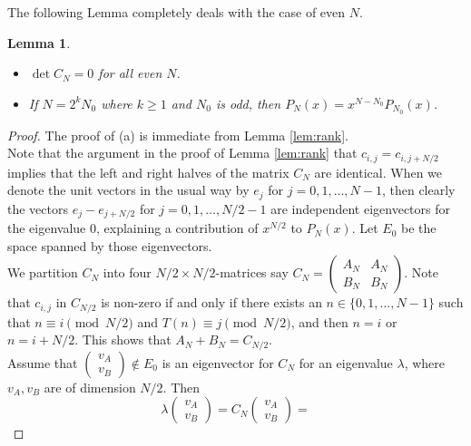 \documentclass[10pt]{article}
\newtheorem{lemma}{Lemma}
\theoremstyle{definition}
\begin{document}
The following Lemma completely deals with the case of even $ N $.

\begin{lemma} \label{lem:even}\
    \begin{itemize}
        \item[\emph{\textbf{(a)}}]
        $ \det C_N = 0 $ for all even $ N $.
        \item[\emph{\textbf{(b)}}]
        If $ N = 2^k N_0 $ where $ k \geq 1 $ and $ N_0 $ is odd, then $ P_N(x) = x^{N-N_0} P_{N_0}(x) $.
    \end{itemize}
\end{lemma}

\begin{proof}
    The proof of (a) is immediate from Lemma \ref{lem:rank}. \\
    Note that the argument in the proof of Lemma \ref{lem:rank} that $ c_{i,j} = c_{i,j+N/2} $ implies that
    the left and right halves of the matrix $ C_N $ are identical. When we denote the unit vectors in the
    usual way by $ e_j $ for $ j = 0, 1, \ldots, N-1 $, then clearly the vectors $ e_j - e_{j+N/2} $ for
    $ j = 0, 1, \ldots, N/2-1 $ are independent eigenvectors for the eigenvalue $ 0 $, explaining a
    contribution of $ x^{N/2} $ to $ P_N(x) $. Let $ E_0 $ be the space spanned by those eigenvectors. \\
    We partition $ C_N $ into four $ N/2 \times N/2 $-matrices say
    $ C_N = \begin{pmatrix} A_N & A_N \\ B_N & B_N \end{pmatrix} $. Note that $ c_{i,j} $ in $ C_{N/2} $ is
    non-zero if and only if there exists an $ n \in \{ 0, 1, \ldots, N-1 \} $ such that
    $ n \equiv i \pmod{N/2} $ and $ T(n) \equiv j \pmod{N/2} $, and then $ n = i $ or $ n = i + N/2 $. This
    shows that $ A_N + B_N = C_{N/2} $. \\
    Assume that $ \begin{pmatrix} v_A \\ v_B \end{pmatrix} \not\in E_0 $ is an eigenvector for $ C_N $ for an
    eigenvalue $ \lambda $, where $ v_A, v_B $ are of dimension $ N/2 $. Then
    \[ \lambda \begin{pmatrix} v_A \\ v_B \end{pmatrix} = C_N \begin{pmatrix} v_A \\ v_B \end{pmatrix} =
\]
\end{proof}
\end{document}
